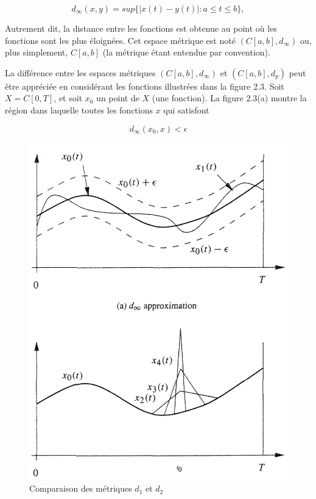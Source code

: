 \documentclass[10pt,twoside,a4paper]{book}
\begin{document}
\begin{equation}
  d_\infty(x, y) = sup\{|x(t) - y(t)| : a \leq t \leq b\} ,
\end{equation}

\noindent
Autrement dit, la distance entre les fonctions est obtenue au point où les fonctions sont les plus éloignées. Cet espace métrique est noté $(C[a, b], d_\infty)$ ou, plus simplement, $C[a, b]$ (la métrique étant entendue par convention).

La différence entre les espaces métriques $(C[a, b], d_\infty)$ et $(C[a, b], d_p)$ peut être appréciée en considérant les fonctions illustrées dans la figure 2.3. Soit $X = C[0, T]$, et soit $x_0$ un point de $X$ (une fonction). 
La figure 2.3(a) montre la région dans laquelle toutes les fonctions $x$ qui satisfont

\begin{equation*}
  d_\infty(x_0, x) < \epsilon
\end{equation*}

\begin{figure}[h]
  \centering
  \includegraphics[scale=0.48]{fig2.3}
  \caption{Comparaison des métriques $d_1$ et $d_2$}
\end{figure}
\end{document}
